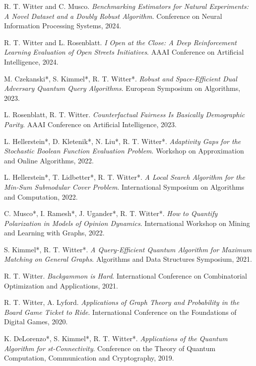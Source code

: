 \documentclass[11pt,a4paper,sans]{moderncv}
\begin{document}
\begin{enumerate}[label={[\arabic*]},align=left]
    \setcounter{enumi}{5}
    \item R. T. Witter and C. Musco. \textit{Benchmarking Estimators for Natural Experiments: A Novel Dataset and a Doubly Robust Algorithm}. Conference on Neural Information Processing Systems, 2024.
    \item R. T. Witter and  L. Rosenblatt. \textit{I Open at the Close: A Deep Reinforcement Learning Evaluation of Open Streets Initiatives}. AAAI Conference on Artificial Intelligence, 2024.
    \item M. Czekanski*, S. Kimmel*, R. T. Witter*. \textit{Robust and Space-Efficient Dual Adversary Quantum Query Algorithms}. European Symposium on Algorithms, 2023.
    \item L. Rosenblatt, R. T. Witter. \textit{Counterfactual Fairness Is Basically Demographic Parity}. AAAI Conference on Artificial Intelligence, 2023.
    \item L. Hellerstein*, D. Kletenik*, N. Liu*, R. T. Witter*. \textit{Adaptivity Gaps for the Stochastic Boolean Function Evaluation Problem}. Workshop on Approximation and Online Algorithms, 2022.
    \item L. Hellerstein*, T. Lidbetter*, R. T. Witter*. \textit{A Local Search Algorithm for the Min-Sum Submodular Cover Problem}. International Symposium on Algorithms and Computation, 2022.
    \item C. Musco*, I. Ramesh*, J. Ugander*, R. T. Witter*. \textit{How to Quantify Polarization in Models of Opinion Dynamics}. International Workshop on Mining and Learning with Graphs, 2022.
    \item S. Kimmel*, R. T. Witter*. \textit{A Query-Efficient Quantum Algorithm for Maximum Matching on General Graphs}. Algorithms and Data Structures Symposium, 2021.
    \item R. T. Witter. \textit{Backgammon is Hard}. International Conference on Combinatorial Optimization and Applications, 2021.
    \item R. T. Witter, A. Lyford. \textit{Applications of Graph Theory and Probability in the Board Game Ticket to Ride}. International Conference on the Foundations of Digital Games, 2020.
    \item K. DeLorenzo*, S. Kimmel*, R. T. Witter*. \textit{Applications of the Quantum Algorithm for st-Connectivity}. Conference on the Theory of Quantum Computation, Communication and Cryptography, 2019.
\end{enumerate}
\end{document}
